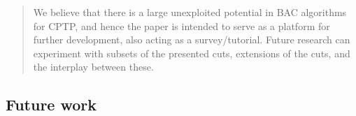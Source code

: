 \begin{quote}
	\cite{jepsen2014}
	We believe that there is a large unexploited potential in BAC algorithms for CPTP, and hence the paper is intended to
	serve as a platform for further development, also acting as a survey/tutorial. Future research can experiment with subsets
	of the presented cuts, extensions of the cuts, and the interplay between these.
\end{quote}

\begin{comment}
\textcite{sadykov2019modern}
Modern MIP solvers implementing the branch-and-cut approach have been progressing at a
fast pace for the last 30 years, and now they have found a widespread use around
the globe. The branch-and-cut approach however has its limits. It is not efficient
(i.e. does not scale well) for problems for which all known linear relaxations are not
sufficiently tight, even after adding cutting planes. These are problems with complex
combinatorial structure appearing for example in routing, scheduling, packing
and other similar applications.
A radical way to improve the quality of linear relaxations is to substantially
increase the number of variables. For such formulations however it is not possible
to apply directly the standard branch-and-cut approach as variables should then be
generated dynamically. An extension of branch-and-cut to this case is called branch-
cut-and-price, in which the linear relaxation of the problem is solved by the column
generation approach.
\end{comment}

\subsection{Future work}

